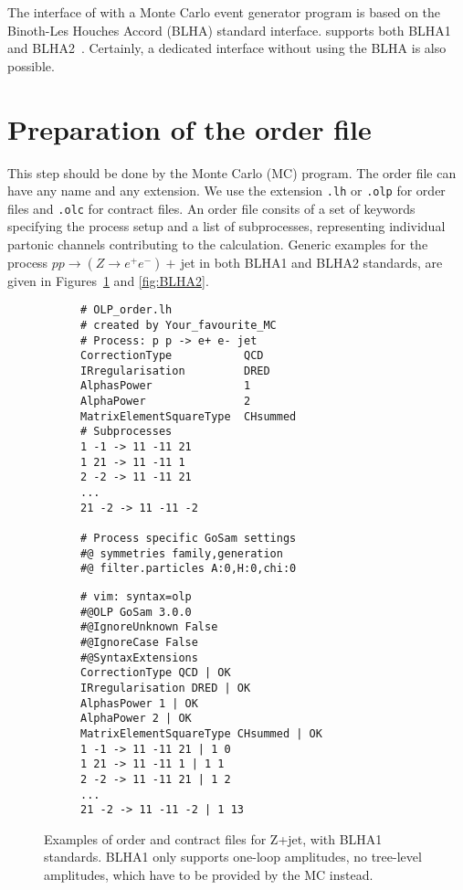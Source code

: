 The interface of \gosam with a Monte Carlo event generator program is based on the Binoth-Les Houches Accord (BLHA) standard interface. \gosamv  supports both BLHA1~\cite{Binoth:2010xt} and BLHA2~\cite{Alioli:2013nda}. Certainly, a dedicated interface without using the BLHA is also possible.

\section{Preparation of the order file}
This step should be done by the Monte Carlo (MC) program. The order file can have any name and any extension. We use  the extension \texttt{.lh} or \texttt{.olp} for order files and \texttt{.olc} for contract files. An order file consits of a set of keywords specifying the process setup and a list of subprocesses, representing individual partonic channels contributing to the calculation. Generic examples for the process $pp\to (Z\to e^+e^-)+$\,jet in both BLHA1 and BLHA2 standards, are given in Figures~\ref{fig:BLHA1} and \ref{fig:BLHA2}.

\begin{figure}
\centering
\begin{subfigure}[]{0.49\textwidth}
\centering
\begin{lstlisting}[title={BLHA1 order file},gobble=0,style=insmall,keepspaces=true,frame=single]
# OLP_order.lh
# created by Your_favourite_MC
# Process: p p -> e+ e- jet
CorrectionType           QCD
IRregularisation         DRED
AlphasPower              1
AlphaPower               2
MatrixElementSquareType  CHsummed
# Subprocesses
1 -1 -> 11 -11 21
1 21 -> 11 -11 1
2 -2 -> 11 -11 21
...
21 -2 -> 11 -11 -2

# Process specific GoSam settings
#@ symmetries family,generation
#@ filter.particles A:0,H:0,chi:0
\end{lstlisting}
\end{subfigure}
\hspace*{5pt}
\begin{subfigure}[]{0.46\textwidth}
\centering
\begin{lstlisting}[title={BLHA1 contract file},gobble=0,style=insmall,keepspaces=true,frame=single]
# vim: syntax=olp
#@OLP GoSam 3.0.0
#@IgnoreUnknown False
#@IgnoreCase False
#@SyntaxExtensions
CorrectionType QCD | OK
IRregularisation DRED | OK
AlphasPower 1 | OK
AlphaPower 2 | OK
MatrixElementSquareType CHsummed | OK
1 -1 -> 11 -11 21 | 1 0
1 21 -> 11 -11 1 | 1 1
2 -2 -> 11 -11 21 | 1 2
...
21 -2 -> 11 -11 -2 | 1 13
\end{lstlisting}
\end{subfigure}
\caption{Examples of order and contract files for Z+jet, with BLHA1 standards. BLHA1 only supports one-loop amplitudes, no tree-level amplitudes, which have to be provided by the MC instead.}
\label{fig:BLHA1}
\end{figure}  


